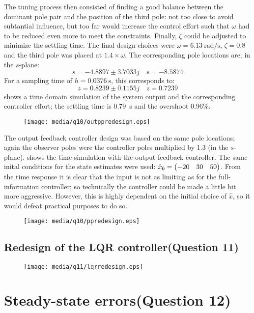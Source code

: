 The tuning process then consisted of finding a good balance between the dominant pole pair and the position of the third pole: not too close to avoid subtantial influence, but too far would increase the control effort such that $\omega$ had to be reduced even more to meet the constraints. Finally, $\zeta$ could be adjusted to minimize the settling time. The final design choices were $\omega = \SI{6.13}{\radian\per\second}$, $\zeta = 0.8$ and the third pole was placed at $1.4\times\omega$. The corresponding pole locations are; in the $s$-plane:
$$ s = -4.8897 \pm 3.7033j  \quad s = -8.5874$$
For a sampling time of $h = \SI{0.0376}{\second}$, this corresponds to:
$$z = 0.8239 \pm 0.1155j \quad z = 0.7239$$
 shows a time domain simulation of the system output and the corresponding controller effort; the settling time is \SI{0.79}{\second} and the overshoot 0.96\%.
\begin{figure}[ht]
    \centering
    \texttt{[image: media/q10/outppredesign.eps]}
    \caption{}
    \label{fig:q10_ppredesign}
\end{figure}
The output feedback controller design was based on the same pole locations; again the observer poles were the controller poles multiplied by 1.3 (in the $s$-plane).  shows the time simulation with the output feedback controller. The same inital conditions for the state estimates were used: $\hat{x}_0 = \mqty(-20 & 30 & 50)$. From the time response it is clear that the input is not as limiting as for the full-information controller; so technically the controller could be made a little bit more aggressive. However, this is highly dependent on the initial choice of $\hat{x}$, so it would defeat practical purposes to do so.
\begin{figure}[ht]
    \centering
    \texttt{[image: media/q10/ppredesign.eps]}
    \caption{}
    \label{fig:q10_outppredesign}
\end{figure}

\subsection{Redesign of the LQR controller\textnormal{\phantom{xxx}(Question 11)}}
\label{sec:retunelqr}
\begin{figure}[ht]
    \centering
    \texttt{[image: media/q11/lqrredesign.eps]}
    \caption{}
    \label{fig:q11_lqrredesign}
\end{figure}

\section{Steady-state errors\textnormal{\phantom{xxx}(Question 12)}}
\label{sec:q12}